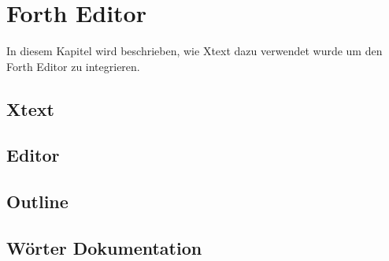 \chapter{Forth Editor}
\label{chap:fortheditor}
In diesem Kapitel wird beschrieben, wie Xtext dazu verwendet wurde um den Forth Editor zu integrieren.

\section{Xtext}

\section{Editor}

\section{Outline}

\section{Wörter Dokumentation}


